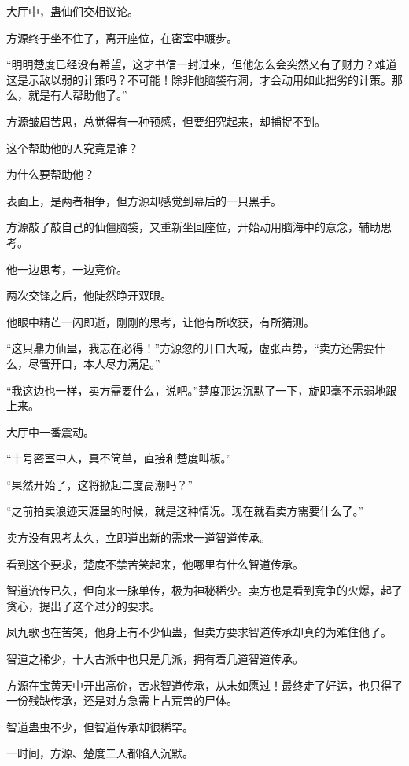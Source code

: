 \begin{this_body}
大厅中，蛊仙们交相议论。

方源终于坐不住了，离开座位，在密室中踱步。

“明明楚度已经没有希望，这才书信一封过来，但他怎么会突然又有了财力？难道这是示敌以弱的计策吗？不可能！除非他脑袋有洞，才会动用如此拙劣的计策。那么，就是有人帮助他了。”

方源皱眉苦思，总觉得有一种预感，但要细究起来，却捕捉不到。

这个帮助他的人究竟是谁？

为什么要帮助他？

表面上，是两者相争，但方源却感觉到幕后的一只黑手。

方源敲了敲自己的仙僵脑袋，又重新坐回座位，开始动用脑海中的意念，辅助思考。

他一边思考，一边竞价。

两次交锋之后，他陡然睁开双眼。

他眼中精芒一闪即逝，刚刚的思考，让他有所收获，有所猜测。

“这只鼎力仙蛊，我志在必得！”方源忽的开口大喊，虚张声势，“卖方还需要什么，尽管开口，本人尽力满足。”

“我这边也一样，卖方需要什么，说吧。”楚度那边沉默了一下，旋即毫不示弱地跟上来。

大厅中一番震动。

“十号密室中人，真不简单，直接和楚度叫板。”

“果然开始了，这将掀起二度高潮吗？”

“之前拍卖浪迹天涯蛊的时候，就是这种情况。现在就看卖方需要什么了。”

卖方没有思考太久，立即道出新的需求一道智道传承。

看到这个要求，楚度不禁苦笑起来，他哪里有什么智道传承。

智道流传已久，但向来一脉单传，极为神秘稀少。卖方也是看到竞争的火爆，起了贪心，提出了这个过分的要求。

凤九歌也在苦笑，他身上有不少仙蛊，但卖方要求智道传承却真的为难住他了。

智道之稀少，十大古派中也只是几派，拥有着几道智道传承。

方源在宝黄天中开出高价，苦求智道传承，从未如愿过！最终走了好运，也只得了一份残缺传承，还是对方急需上古荒兽的尸体。

智道蛊虫不少，但智道传承却很稀罕。

一时间，方源、楚度二人都陷入沉默。

\end{this_body}

